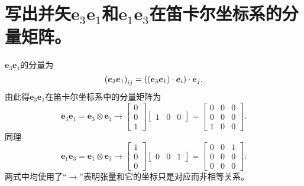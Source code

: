 \section{写出并矢$\bm{e}_3\bm{e}_1$和$\bm{e}_1\bm{e}_3$在笛卡尔坐标系的分量矩阵。}

    $\bm{e}_3\bm{e}_1$的分量为
    \begin{equation}
        \left(\bm{e}_3 \bm{e}_1\right)_{ij} = ((\bm{e}_3\bm{e}_1)\cdot \bm{e}_i)\cdot \bm{e}_j.
    \end{equation}
    由此得$\bm{e}_3\bm{e}_1$在笛卡尔坐标系中的分量矩阵为
    \begin{equation}
        \bm{e}_3\bm{e}_1 = \bm{e}_3\otimes\bm{e}_1 \longrightarrow  
        \begin{bmatrix}
            0 \\
            0 \\
            1
        \end{bmatrix}
        \begin{bmatrix}
            1  & 0 & 0
        \end{bmatrix} = 
        \begin{bmatrix}
            0  & 0 & 0\\
            0  & 0 & 0\\
            1  & 0 & 0
        \end{bmatrix}.
    \end{equation}
    同理
    \begin{equation}
        \bm{e}_1\bm{e}_3 = \bm{e}_1\otimes\bm{e}_3 \longrightarrow  
        \begin{bmatrix}
            1 \\
            0 \\
            0
        \end{bmatrix}
        \begin{bmatrix}
            0  & 0 & 1
        \end{bmatrix} = 
        \begin{bmatrix}
            0  & 0 & 1\\
            0  & 0 & 0\\
            0  & 0 & 0
        \end{bmatrix}.
    \end{equation}
    两式中均使用了“$\longrightarrow $”表明张量和它的坐标只是对应而非相等关系。
